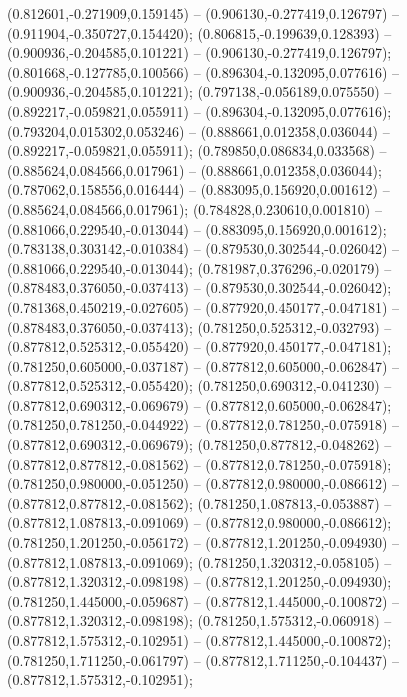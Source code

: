  (0.812601,-0.271909,0.159145) -- (0.906130,-0.277419,0.126797) -- (0.911904,-0.350727,0.154420);
 (0.806815,-0.199639,0.128393) -- (0.900936,-0.204585,0.101221) -- (0.906130,-0.277419,0.126797);
 (0.801668,-0.127785,0.100566) -- (0.896304,-0.132095,0.077616) -- (0.900936,-0.204585,0.101221);
 (0.797138,-0.056189,0.075550) -- (0.892217,-0.059821,0.055911) -- (0.896304,-0.132095,0.077616);
 (0.793204,0.015302,0.053246) -- (0.888661,0.012358,0.036044) -- (0.892217,-0.059821,0.055911);
 (0.789850,0.086834,0.033568) -- (0.885624,0.084566,0.017961) -- (0.888661,0.012358,0.036044);
 (0.787062,0.158556,0.016444) -- (0.883095,0.156920,0.001612) -- (0.885624,0.084566,0.017961);
 (0.784828,0.230610,0.001810) -- (0.881066,0.229540,-0.013044) -- (0.883095,0.156920,0.001612);
 (0.783138,0.303142,-0.010384) -- (0.879530,0.302544,-0.026042) -- (0.881066,0.229540,-0.013044);
 (0.781987,0.376296,-0.020179) -- (0.878483,0.376050,-0.037413) -- (0.879530,0.302544,-0.026042);
 (0.781368,0.450219,-0.027605) -- (0.877920,0.450177,-0.047181) -- (0.878483,0.376050,-0.037413);
 (0.781250,0.525312,-0.032793) -- (0.877812,0.525312,-0.055420) -- (0.877920,0.450177,-0.047181);
 (0.781250,0.605000,-0.037187) -- (0.877812,0.605000,-0.062847) -- (0.877812,0.525312,-0.055420);
 (0.781250,0.690312,-0.041230) -- (0.877812,0.690312,-0.069679) -- (0.877812,0.605000,-0.062847);
 (0.781250,0.781250,-0.044922) -- (0.877812,0.781250,-0.075918) -- (0.877812,0.690312,-0.069679);
 (0.781250,0.877812,-0.048262) -- (0.877812,0.877812,-0.081562) -- (0.877812,0.781250,-0.075918);
 (0.781250,0.980000,-0.051250) -- (0.877812,0.980000,-0.086612) -- (0.877812,0.877812,-0.081562);
 (0.781250,1.087813,-0.053887) -- (0.877812,1.087813,-0.091069) -- (0.877812,0.980000,-0.086612);
 (0.781250,1.201250,-0.056172) -- (0.877812,1.201250,-0.094930) -- (0.877812,1.087813,-0.091069);
 (0.781250,1.320312,-0.058105) -- (0.877812,1.320312,-0.098198) -- (0.877812,1.201250,-0.094930);
 (0.781250,1.445000,-0.059687) -- (0.877812,1.445000,-0.100872) -- (0.877812,1.320312,-0.098198);
 (0.781250,1.575312,-0.060918) -- (0.877812,1.575312,-0.102951) -- (0.877812,1.445000,-0.100872);
 (0.781250,1.711250,-0.061797) -- (0.877812,1.711250,-0.104437) -- (0.877812,1.575312,-0.102951);
